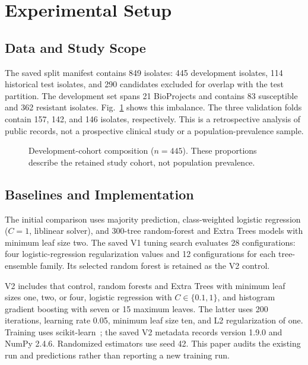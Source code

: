 \documentclass[conference]{IEEEtran}
\begin{document}
\section{Experimental Setup}
\subsection{Data and Study Scope}
The saved split manifest contains 849 isolates: 445 development isolates, 114 historical test isolates, and 290 candidates excluded for overlap with the test partition. The development set spans 21 BioProjects and contains 83 susceptible and 362 resistant isolates. Fig.~\ref{fig:pie} shows this imbalance. The three validation folds contain 157, 142, and 146 isolates, respectively. This is a retrospective analysis of public records, not a prospective clinical study or a population-prevalence sample.

\begin{figure}[t]
\centering
{}
\caption{Development-cohort composition ($n=445$). These proportions describe the retained study cohort, not population prevalence.}
\label{fig:pie}
\end{figure}

\subsection{Baselines and Implementation}
The initial comparison uses majority prediction, class-weighted logistic regression ($C=1$, liblinear solver), and 300-tree random-forest and Extra Trees models with minimum leaf size two. The saved V1 tuning search evaluates 28 configurations: four logistic-regression regularization values and 12 configurations for each tree-ensemble family. Its selected random forest is retained as the V2 control.

V2 includes that control, random forests and Extra Trees with minimum leaf sizes one, two, or four, logistic regression with $C\in\{0.1,1\}$, and histogram gradient boosting with seven or 15 maximum leaves. The latter uses 200 iterations, learning rate 0.05, minimum leaf size ten, and L2 regularization of one. Training uses scikit-learn~\cite{sklearn}; the saved V2 metadata records version 1.9.0 and NumPy 2.4.6. Randomized estimators use seed 42. This paper audits the existing run and predictions rather than reporting a new training run.
\end{document}
